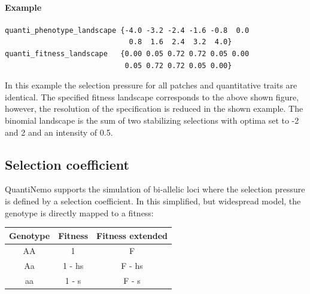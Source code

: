 \documentclass[letterpaper,12pt,oneside]{book}
\begin{document}
\paragraph{Example}\hspace*{\fill}
\begin{lstlisting}[frame=single]
quanti_phenotype_landscape {-4.0 -3.2 -2.4 -1.6 -0.8  0.0  
                             0.8  1.6  2.4  3.2  4.0}
quanti_fitness_landscape   {0.00 0.05 0.72 0.72 0.05 0.00 
                            0.05 0.72 0.72 0.05 0.00}    
\end{lstlisting}
In this example the selection pressure for all patches and quantitative traits are identical. The specified fitness landscape corresponds to the above shown figure, however, the resolution of the specification is reduced in the shown example. The binomial landscape is the sum of two stabilizing selections with optima set to -2 and 2 and an intensity of 0.5. 


\subsection{Selection coefficient}
QuantiNemo supports the simulation of bi-allelic loci where the selection pressure is defined by a selection coefficient. In this simplified, but widespread model, the genotype is directly mapped to a fitness:\\

\begin{tabular}{ccc}
 \hline            
Genotype & Fitness & Fitness extended \\
\hline
AA & 1             & F      \\
Aa & 1 - hs & F - hs \\
aa & 1 - s     & F - s  \\
\hline
\end{tabular}
\end{document}
